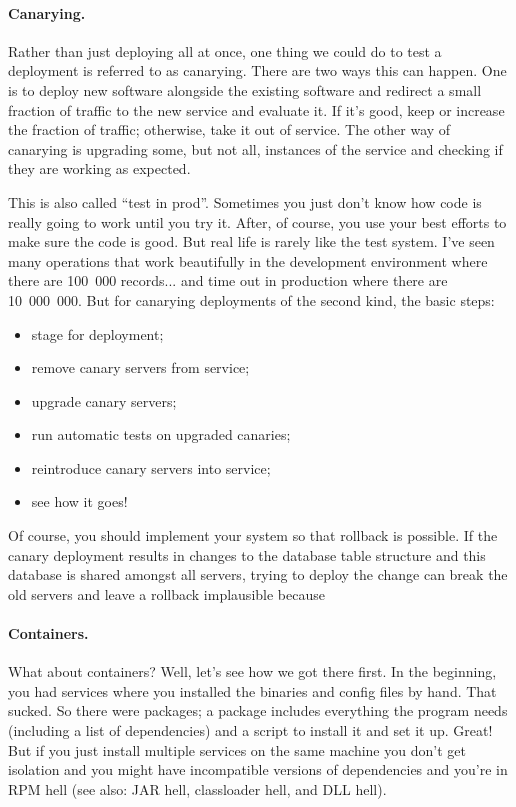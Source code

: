 \paragraph{Canarying.} Rather than just deploying all at once, one thing we could do to test a deployment is referred to as canarying. There are two ways this can happen. One is to deploy new software alongside the existing software and redirect a small fraction of traffic  to the new service and evaluate it. If it's good, keep or increase the fraction of traffic; otherwise, take it out of service. The other way of canarying is upgrading some, but not all, instances of the service and checking if they are working as expected.

This is also called ``test in prod''. Sometimes you just don't know how code is really going to work until you try it. After, of course, you use your best
efforts to make sure the code is good. But real life is rarely like the test system. I've seen many operations that work beautifully in the development environment where there are 100~000 records... and time out in production where there are 10~000~000. But for canarying deployments of the second kind, the basic steps:
\begin{itemize}
\item stage for deployment;
\item remove canary servers from service;
\item upgrade canary servers;
\item run automatic tests on upgraded canaries;
\item reintroduce canary servers into service;
\item see how it goes!
\end{itemize}

Of course, you should implement your system so that rollback is possible. If the canary deployment results in changes to the database table structure and this database is shared amongst all servers, trying to deploy the change can break the old servers and leave a rollback implausible because 



\paragraph{Containers.} What about containers? Well, let's see how we got there first. In the beginning, you had services where you installed the binaries and config files by hand. That sucked. So there were packages; a package includes everything the program needs (including a list of dependencies) and a script to install it and set it up. Great! But if you just install multiple services on the same machine you don't get isolation and you might have incompatible versions of dependencies and you're in RPM hell (see also: JAR hell, classloader hell, and DLL hell).

